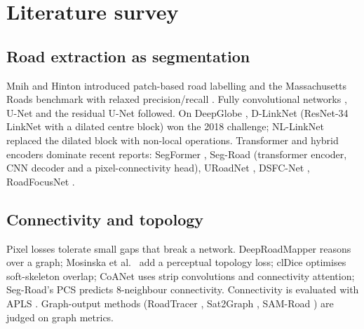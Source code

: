 \documentclass[11pt]{article}
\begin{document}
\section{Literature survey}
\label{sec:related}

\subsection{Road extraction as segmentation}
Mnih and Hinton \cite{mnih2010} introduced patch-based road labelling and the Massachusetts Roads
benchmark with relaxed precision/recall \cite{mnih2013}. Fully convolutional networks \cite{long2015},
U-Net \cite{ronneberger2015} and the residual U-Net \cite{zhang2018res} followed. On DeepGlobe
\cite{demir2018}, D-LinkNet \cite{zhou2018} (ResNet-34 LinkNet with a dilated centre block) won the
2018 challenge; NL-LinkNet \cite{wang2019nl} replaced the dilated block with non-local operations.
Transformer and hybrid encoders dominate recent reports: SegFormer \cite{xie2021segformer},
Seg-Road \cite{tao2023} (transformer encoder, CNN decoder and a pixel-connectivity head), URoadNet
\cite{uroadnet2024}, DSFC-Net \cite{zhang2026dsfc}, RoadFocusNet \cite{roadfocusnet2025}.

\subsection{Connectivity and topology}
Pixel losses tolerate small gaps that break a network. DeepRoadMapper \cite{mattyus2017} reasons over a
graph; Mosinska et al.\ \cite{mosinska2018} add a perceptual topology loss; clDice \cite{shit2021}
optimises soft-skeleton overlap; CoANet \cite{mei2021} uses strip convolutions and connectivity
attention; Seg-Road's PCS \cite{tao2023} predicts 8-neighbour connectivity. Connectivity is evaluated
with APLS \cite{vanetten2018}. Graph-output methods (RoadTracer \cite{bastani2018}, Sat2Graph
\cite{he2020sat2graph}, SAM-Road \cite{hetang2024}) are judged on graph metrics.
\end{document}
